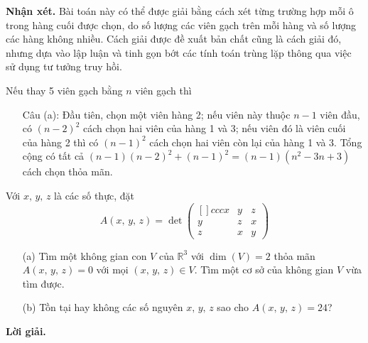 \textbf{Nhận xét. }Bài toán này có thể được giải bằng cách xét từng trường hợp mỗi ô trong hàng cuối được chọn, do số lượng các viên gạch trên mỗi hàng và số lượng các hàng không nhiều. Cách giải được đề xuất bản chất cũng là cách giải đó, nhưng dựa vào lập luận và tinh gọn bớt các tính toán trùng lặp thông qua việc sử dụng tư tưởng truy hồi. 

Nếu thay 5 viên gạch bằng $n$ viên gạch thì 
\begin{enumerate}
    \item[] {Câu (a): Đầu tiên, chọn một viên hàng 2; nếu viên này thuộc $n - 1$ viên đầu, có $(n - 2)^2$ cách chọn hai viên của hàng 1 và 3; nếu viên đó là viên cuối của hàng 2 thì có $(n - 1)^2$ cách chọn hai viên còn lại của hàng 1 và 3. Tổng cộng có tất cả $(n - 1)(n - 2)^2 + (n - 1)^2 = (n - 1)(n^2 - 3n + 3)$ cách chọn thỏa mãn.}
\end{enumerate}

\begin{tcolorbox}[title=\textbf{Bài toán B.5 + A.4.},breakable]
    Với $x,\,y,\,z$ là các số thực, đặt 
    $$A(x,\,y,\,z) = \det \begin{pmatrix}[]{ccc}
        x & y & z \\
        y & z & x \\
        z & x & y
    \end{pmatrix}$$
    \begin{enumerate}
        \item[(a)] {Tìm một không gian con $V$ của $\mathbb{R}^3$ với $\dim (V) = 2$ thỏa mãn $A(x,\,y,\,z)=0$ với mọi $(x,\,y,\,z) \in V$. Tìm một cơ sở của không gian $V$ vừa tìm được.}
        \item[(b)] {Tồn tại hay không các số nguyên $x,\,y,\,z$ sao cho $A(x,\,y,\,z) = 24$?}
    \end{enumerate}
\end{tcolorbox}

\textbf{Lời giải. }

